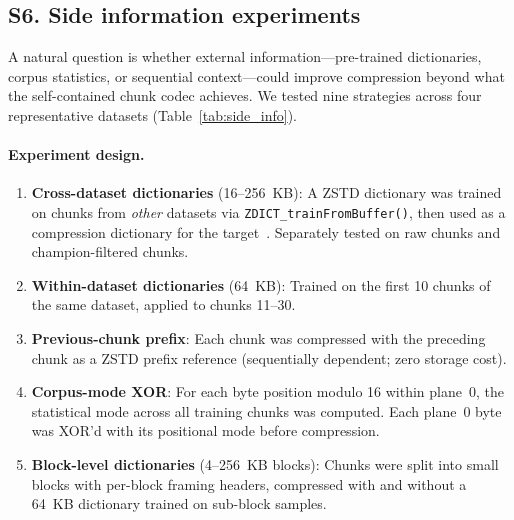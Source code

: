 \documentclass[10pt,twocolumn,letterpaper]{article}
\begin{document}
\subsection*{S6. Side information experiments}

A natural question is whether external information---pre-trained dictionaries, corpus statistics, or sequential context---could improve compression beyond what the self-contained chunk codec achieves.
We tested nine strategies across four representative datasets (Table~\ref{tab:side_info}).

\paragraph{Experiment design.}
\begin{enumerate}
\item \textbf{Cross-dataset dictionaries} (16--256~KB): A ZSTD dictionary was trained on chunks from \emph{other} datasets via \texttt{ZDICT\_trainFromBuffer()}, then used as a compression dictionary for the target~\cite{collet2018zstandard}.
Separately tested on raw chunks and champion-filtered chunks.
\item \textbf{Within-dataset dictionaries} (64~KB): Trained on the first 10 chunks of the same dataset, applied to chunks 11--30.
\item \textbf{Previous-chunk prefix}: Each chunk was compressed with the preceding chunk as a ZSTD prefix reference (sequentially dependent; zero storage cost).
\item \textbf{Corpus-mode XOR}: For each byte position modulo 16 within plane~0, the statistical mode across all training chunks was computed. Each plane~0 byte was XOR'd with its positional mode before compression.
\item \textbf{Block-level dictionaries} (4--256~KB blocks): Chunks were split into small blocks with per-block framing headers, compressed with and without a 64~KB dictionary trained on sub-block samples.
\end{enumerate}
\end{document}
